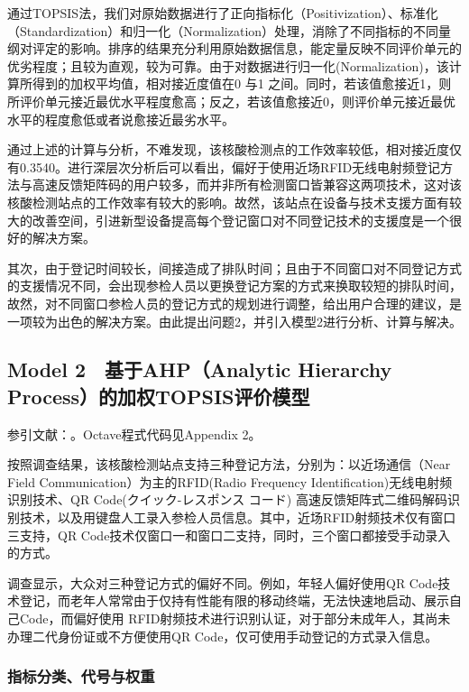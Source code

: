 \documentclass[
  journal=,
  manuscript=,
  year=2022,
  volume=01,
]{cup-journal}
\begin{document}
\par 通过TOPSIS法，我们对原始数据进行了正向指标化（Positivization）、标准化（Standardization）和归一化（Normalization）处理，消除了不同指标的不同量纲对评定的影响。排序的结果充分利用原始数据信息，能定量反映不同评价单元的优劣程度；且较为直观，较为可靠。由于对数据进行归一化(Normalization)，该计算所得到的加权平均值，相对接近度值在0 与1 之间。同时，若该值愈接近1，则所评价单元接近最优水平程度愈高；反之，若该值愈接近0，则评价单元接近最优水平的程度愈低或者说愈接近最劣水平。
\par 通过上述的计算与分析，不难发现，该核酸检测点的工作效率较低，相对接近度仅有0.3540。进行深层次分析后可以看出，偏好于使用近场RFID无线电射频登记方法与高速反馈矩阵码的用户较多，而并非所有检测窗口皆兼容这两项技术，这对该核酸检测站点的工作效率有较大的影响。故然，该站点在设备与技术支援方面有较大的改善空间，引进新型设备提高每个登记窗口对不同登记技术的支援度是一个很好的解决方案。
\par 其次，由于登记时间较长，间接造成了排队时间；且由于不同窗口对不同登记方式的支援情况不同，会出现参检人员以更换登记方案的方式来换取较短的排队时间，故然，对不同窗口参检人员的登记方式的规划进行调整，给出用户合理的建议，是一项较为出色的解决方案。由此提出问题2，并引入模型2进行分析、计算与解决。

\subsection{Model 2　基于AHP（Analytic Hierarchy Process）的加权TOPSIS评价模型}
\noindent 参引文献：\cite{vasquez2021ahp}。Octave程式代码见Appendix 2。
\par 按照调查结果，该核酸检测站点支持三种登记方法，分别为：以近场通信（Near Field Communication）为主的RFID(Radio Frequency Identification)无线电射频识别技术、QR Code(クイック-レスポンス コード) 高速反馈矩阵式二维码解码识别技术，以及用键盘人工录入参检人员信息。其中，近场RFID射频技术仅有窗口三支持，QR Code技术仅窗口一和窗口二支持，同时，三个窗口都接受手动录入的方式。
\par 调查显示，大众对三种登记方式的偏好不同。例如，年轻人偏好使用QR Code技术登记，而老年人常常由于仅持有性能有限的移动终端，无法快速地启动、展示自己Code，而偏好使用 RFID射频技术进行识别认证，对于部分未成年人，其尚未办理二代身份证或不方便使用QR Code，仅可使用手动登记的方式录入信息。 


\subsubsection{指标分类、代号与权重}
\end{document}
